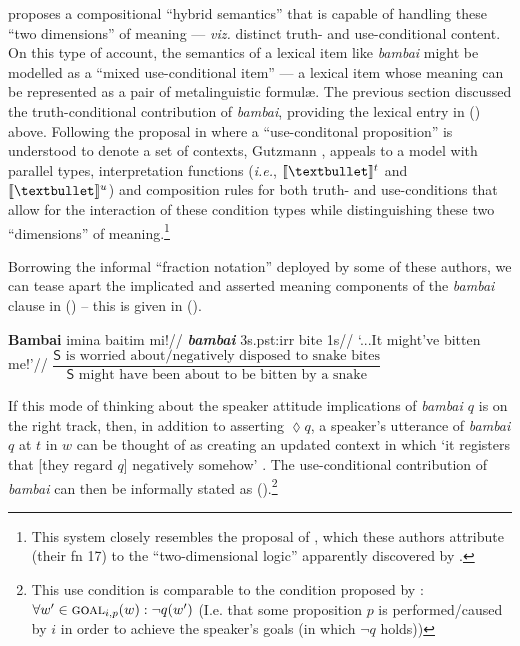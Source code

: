 \citet{Gutzmann2015} proposes a compositional ``hybrid semantics'' that is capable of handling these ``two dimensions'' of meaning --- \textit{viz.} distinct truth- and use-conditional content. On this type of account, the semantics of a lexical item like \textit{bambai} might be modelled as a ``mixed use-conditional item'' --- a lexical item whose meaning can be represented as a pair of metalinguistic formulæ.
The previous section discussed the truth-conditional contribution of \textit{bambai}, providing the lexical entry in () above. Following the proposal in \citet{Kaplan1999} where a ``use-conditonal proposition'' is understood to denote a set of contexts, Gutzmann \citeyearpar{Gutzmann2015}, appeals to a model with parallel types, interpretation functions (\textit{i.e.}, $ \denote[t]{•} $ and $ \denote[u]{•} $) and composition rules for both truth- and use-conditions that allow for the interaction of these condition types while distinguishing these two ``dimensions'' of meaning.\footnote{This system closely resembles the proposal of \citet{Karttunen1979}, which these authors attribute (their fn 17) to the ``two-dimensional logic'' apparently discovered by \citet{Herzberger1973}.}


 Borrowing the informal ``fraction notation'' deployed by some of these authors, we can tease apart the implicated and asserted meaning components of the \textit{bambai} clause in () -- this is given in (\nextx).%


\pex\a\begingl
\gla \textbf{Bambai} imina {baitim} mi!//
\glb \textsl{\textbf{bambai}} 3s.\gls{pst}:\gls{irr} bite 1s//
\glft`...It might've bitten me!'\trailingcitation{[GT~01052017]}//\endgl
\a$\dfrac{\mathsf S\text{ is worried about/negatively disposed to snake bites}}{\mathsf S\text{ might have been about to be bitten by a snake}}$
\xe

If this mode of thinking about the speaker attitude implications of \textit{bambai $q$} is on the right track, then, in addition to asserting $ \lozenge q $, a speaker's utterance of \textit{bambai $ q $} at $ t $ in $ w $ can be thought of as creating an updated context in which `it registers that [they regard $q$] negatively somehow' \citep[175]{Potts2007}.
The use-conditional contribution of \textit{bambai} can then be informally stated as (\nextx).\footnote{This use condition is comparable to the condition proposed by \citet{AnderBois2020}: $ \forall w'\in\textsc{goal}_{i,p}(w):\neg q(w') $ (I.e. that some proposition $ p $ is performed/caused by $ i $ in order to achieve the speaker's goals (in which $ \neg q $ holds))}


